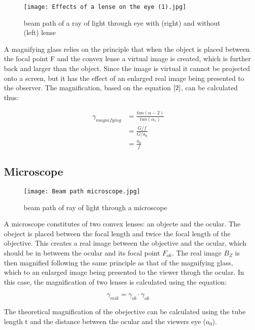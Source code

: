 \label{B}
\begin{figure}[h!]
    \centering
  \texttt{[image: Effects of a lense on the eye (1).jpg]}
  \caption{beam path of a ray of light through eye with (right) and without (left) lense}
  \end{figure}

A magnifying glass relies on the principle that when the object is placed between the focal point F and the convex lense a virtual 
image is created, which is further back and larger than the object. Since the image is virtual it cannot be projected onto a screen, 
but it has the effect of an enlarged real image being presented to the observer.
The magnification, based on the equation $\ref{2}$, can be calculated thus:

\label{3}
\begin{align*}
    \gamma_{magnifying} & = \frac{tan(\alpha-{2})}{tan(\alpha_{1})} \\
    & = \frac{G/f}{G/a_{0}} \\
    & = \frac{a_{0}}{f}      \tag{3}
\end{align*}

\subsection{Microscope}

\label{C}
\begin{figure}[h!]
    \centering
  \texttt{[image: Beam path microscope.jpg]}
  \caption{beam path of ray of light through a microscope}
  \end{figure}

A microscope constitutes of two convex lenses: an objecte and the ocular. The obeject is placed  between the focal length and twice the 
focal length of the objective. This creates a real image between the objective and the ocular, which should be in betweem the ocular and 
its focal point $F_{ok}$. The real image $B_{Z}$ is then magnified following the same principle as that of the magnifying glass, which to
an enlarged image being presented to the viewer throgh the ocular.
In this case, the magnification of two lenses is calculated using the equation:

\label{4}
\begin{equation}
  \gamma_{mik} = \gamma_{ob} \cdot \gamma_{ok} \tag{4}
  \end{equation}

The theoretical magnification of the obejective can be calculated using the tube length t and the distance between the ocular and the viewers
eye ($a_{0}$).

